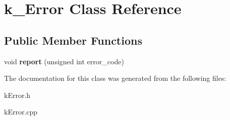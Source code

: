 \hypertarget{classk__Error}{}\section{k\+\_\+\+Error Class Reference}
\label{classk__Error}
\subsection*{Public Member Functions}
\begin{DoxyCompactItemize}
\item 
void {\bfseries report} (unsigned int error\+\_\+code)\hypertarget{classk__Error_ada27af70eb2ef5ec5d2d3d7a90b923fb}{}\label{classk__Error_ada27af70eb2ef5ec5d2d3d7a90b923fb}

\end{DoxyCompactItemize}


The documentation for this class was generated from the following files\+:\begin{DoxyCompactItemize}
\item 
k\+Error.\+h\item 
k\+Error.\+cpp\end{DoxyCompactItemize}
